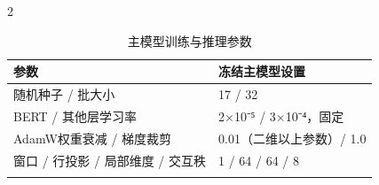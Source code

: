 \begin{PaperTable}{2}

\begin{table}[!htbp]
\centering\caption{主模型训练与推理参数\label{q3-tab3}}
\begin{tabular}{@{}ll@{}}
\toprule
\begin{minipage}[b]{\dimexpr 0.440000\linewidth-0.880000\tabcolsep\relax}\raggedright
参数\strut
\end{minipage} & \begin{minipage}[b]{\dimexpr 0.560000\linewidth-1.120000\tabcolsep\relax}\raggedright
冻结主模型设置\strut
\end{minipage}\tabularnewline
\midrule

\begin{minipage}[t]{\dimexpr 0.440000\linewidth-0.880000\tabcolsep\relax}\raggedright
随机种子 / 批大小\strut
\end{minipage} & \begin{minipage}[t]{\dimexpr 0.560000\linewidth-1.120000\tabcolsep\relax}\raggedright
17 / 32\strut
\end{minipage}\tabularnewline
\begin{minipage}[t]{\dimexpr 0.440000\linewidth-0.880000\tabcolsep\relax}\raggedright
BERT / 其他层学习率\strut
\end{minipage} & \begin{minipage}[t]{\dimexpr 0.560000\linewidth-1.120000\tabcolsep\relax}\raggedright
2×10⁻⁵ / 3×10⁻⁴，固定\strut
\end{minipage}\tabularnewline
\begin{minipage}[t]{\dimexpr 0.440000\linewidth-0.880000\tabcolsep\relax}\raggedright
AdamW权重衰减 / 梯度裁剪\strut
\end{minipage} & \begin{minipage}[t]{\dimexpr 0.560000\linewidth-1.120000\tabcolsep\relax}\raggedright
0.01（二维以上参数）/ 1.0\strut
\end{minipage}\tabularnewline
\begin{minipage}[t]{\dimexpr 0.440000\linewidth-0.880000\tabcolsep\relax}\raggedright
窗口 / 行投影 / 局部维度 / 交互秩\strut
\end{minipage} & \begin{minipage}[t]{\dimexpr 0.560000\linewidth-1.120000\tabcolsep\relax}\raggedright
1 / 64 / 64 / 8\strut
\end{minipage}\tabularnewline
\begin{minipage}[t]{\dimexpr 0.440000\linewidth-0.880000\tabcolsep\relax}\raggedright

\end{minipage}
\end{tabular}
\end{table}
\end{PaperTable}
